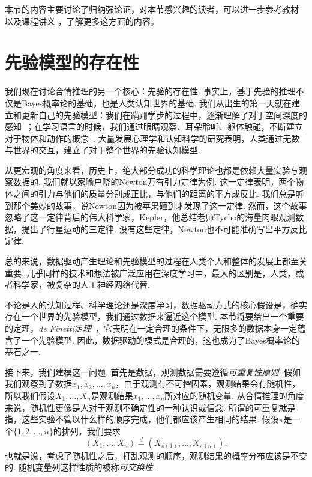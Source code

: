 \begin{remark}
    本节的内容主要讨论了归纳强论证，对本节感兴趣的读者，可以进一步参考教材 \cite{skyrmsChoiceChanceIntroduction1975} 以及课程讲义 \cite{pacuitReasoningHumansClear}，了解更多这方面的内容。
\end{remark}

\section{先验模型的存在性}

我们现在讨论合情推理的另一个核心：先验的存在性. 事实上，基于先验的推理不仅是Bayes概率论的基础，也是人类认知世界的基础. 我们从出生的第一天就在建立和更新自己的先验模型：我们在蹒跚学步的过程中，逐渐理解了对于空间深度的感知~\cite{walkComparativeAnalyticalStudy1961}；在学习语言的时候，我们通过眼睛观察、耳朵聆听、躯体触碰，不断建立对于物体和动作的概念~\cite{vongGroundedLanguageAcquisition2024,saffranStatisticalLearning8MonthOld1996}. 大量发展心理学和认知科学的研究表明，人类通过无数与世界的交互，建立了对于整个世界的先验认知模型.

从更宏观的角度来看，历史上，绝大部分成功的科学理论也都是依赖大量实验与观察数据的. 我们就以家喻户晓的Newton万有引力定律为例. 这一定律表明，两个物体之间的引力与他们的质量分别成正比，与他们的距离的平方成反比. 我们总是听到那个美妙的故事，说Newton因为被苹果砸到才发现了这一定律. 然而，这个故事忽略了这一定律背后的伟大科学家，Kepler，他总结老师Tycho的海量肉眼观测数据，提出了行星运动的三定律. 没有这些定律，Newton也不可能准确写出平方反比定律. 

总的来说，数据驱动产生理论和先验模型的过程在人类个人和整体的发展上都至关重要. 几乎同样的技术和想法被广泛应用在深度学习中，最大的区别是，人类，或者科学家，被复杂的人工神经网络代替. 

不论是人的认知过程、科学理论还是深度学习，数据驱动方式的核心假设是，确实存在一个世界的先验模型，我们通过数据来逼近这个模型. 本节将要给出一个重要的定理，\textit{de Finetti定理}~\cite{diaconisFiniteExchangeableSequences1980,kernsDefinettisTheoremAbstract2006,durrettProbabilityTheoryExamples2019}，它表明在一定合理的条件下，无限多的数据本身一定蕴含了一个先验模型. 因此，数据驱动的模式是合理的，这也成为了Bayes概率论的基石之一.

接下来，我们建模这一问题. 首先是数据，观测数据需要遵循\textit{可重复性原则}. 假如我们观察到了数据$x_1,x_2,\dots,x_n$，由于观测有不可控因素，观测结果会有随机性，所以我们假设$X_1,\dots,X_n$是观测结果$x_1,\dots,x_n$所对应的随机变量. 从合情推理的角度来说，随机性更像是人对于观测不确定性的一种认识或信念. 所谓的可重复就是指，这些实验不管以什么样的顺序完成，他们都应该产生相同的结果. 假设$\pi$是一个$\{1,2,\dots,n\}$的排列，我们要求
\[
    (X_1,\dots,X_n)\stackrel{d}{=}(X_{\pi(1)},\dots,X_{\pi(n)}).
\]
也就是说，考虑了随机性之后，打乱观测的顺序，观测结果的概率分布应该是不变的. 随机变量列这样性质的被称\textit{可交换性}. 

